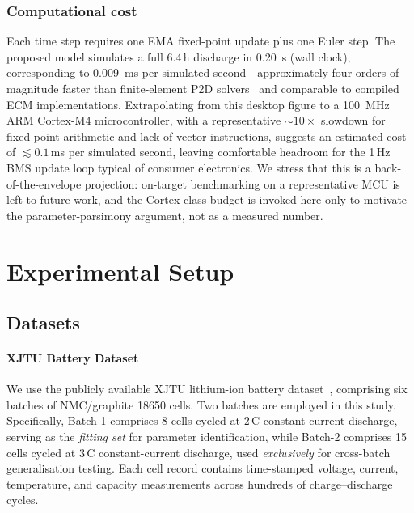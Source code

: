 \documentclass[5p,times,number]{elsarticle}
\begin{document}
\subsubsection{Computational cost}\label{sec:comp_cost}
Each time step requires one EMA fixed-point update plus one Euler step.
The proposed model simulates a full 6.4\,h discharge in \SI{0.20}{\second} (wall clock), corresponding to \SI{0.009}{\milli\second} per simulated second---approximately four orders of magnitude faster than finite-element P2D solvers~\cite{Doyle1993,Newman2004,Mama2025} and comparable to compiled ECM implementations.
Extrapolating from this desktop figure to a \SI{100}{\mega\hertz} ARM Cortex-M4 microcontroller, with a representative $\sim\!10\times$ slowdown for fixed-point arithmetic and lack of vector instructions, suggests an estimated cost of $\lesssim 0.1$\,ms per simulated second, leaving comfortable headroom for the 1\,Hz BMS update loop typical of consumer electronics. We stress that this is a back-of-the-envelope projection: on-target benchmarking on a representative MCU is left to future work, and the Cortex-class budget is invoked here only to motivate the parameter-parsimony argument, not as a measured number.

\section{Experimental Setup}\label{sec:experiments}
\subsection{Datasets}\label{sec:datasets}
\paragraph{XJTU Battery Dataset}
We use the publicly available XJTU lithium-ion battery dataset~\cite{XJTU2020}, comprising six batches of NMC/graphite 18650 cells.
Two batches are employed in this study.
Specifically, Batch-1 comprises 8 cells cycled at 2\,C constant-current discharge, serving as the \emph{fitting set} for parameter identification, while Batch-2 comprises 15 cells cycled at 3\,C constant-current discharge, used \emph{exclusively} for cross-batch generalisation testing.
Each cell record contains time-stamped voltage, current, temperature, and capacity measurements across hundreds of charge--discharge cycles.
\end{document}
